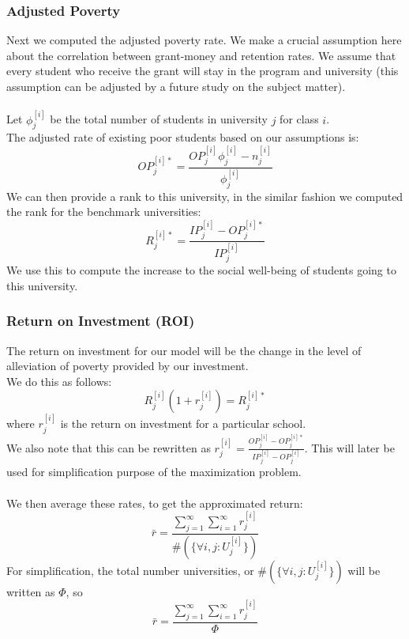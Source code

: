 \documentclass[12pt]{scrartcl}
\begin{document}
	\subsubsection{Adjusted Poverty}
		Next we computed the adjusted poverty rate. We make a crucial assumption here about the correlation between grant-money and retention rates. We assume that every student who receive the grant will stay in the program and university (this assumption can be adjusted by a future study on the subject matter).\\
		\\
		Let $\phi_j^{[i]}$ be the total number of students in university $j$ for class $i$.\\
		The adjusted rate of existing poor students based on our assumptions is:
		$$
			OP_j^{[i]*} = \frac{  OP_j^{[i]}\phi_j^{[i]}-n_j^{[i]}  }{ \phi_j^{[i]}  }
		$$
		We can then provide a rank to this university, in the similar fashion we computed the rank for the benchmark universities:
		$$
			R_j^{[i]*}=\frac{IP_j^{[i]}-OP_j^{[i]*}}{IP_j^{[i]}}
		$$
		We use this to compute the increase to the social well-being of students going to this university. 

	\subsubsection{Return on Investment (ROI)}
		The return on investment for our model will be the change in the level of alleviation of poverty provided by our investment.\\
		We do this as follows:
		$$
			R_j^{[i]}(1+r_j^{[i]}) = R_j^{[i]*}
		$$
		where $r_j^{[i]}$ is the return on investment for a particular school.\\
		We also note that this can be rewritten as $r_j^{[i]} = \frac{ OP_j^{[i]} - OP_j^{[i]*}  }{ IP_j^{[i]} - OP_j^{[i]}  }$. This will later be used for simplification purpose of the maximization problem.\\
		\\
		We then average these rates, to get the approximated return:
		$$
			\bar{r} = \frac{ \sum_{j=1}^\infty\sum_{i=1}^\infty r_j^{[i]}  }{ \# (\{ \forall i, j :  U_j^{[i]} \}) }
		$$
		For simplification, the total number universities, or $\# (\{ \forall i, j :  U_j^{[i]} \})$ will be written as $\Phi$, so
		$$
			\bar{r} = \frac{ \sum_{j=1}^\infty\sum_{i=1}^\infty r_j^{[i]}  }{ \Phi }
		$$
\end{document}
